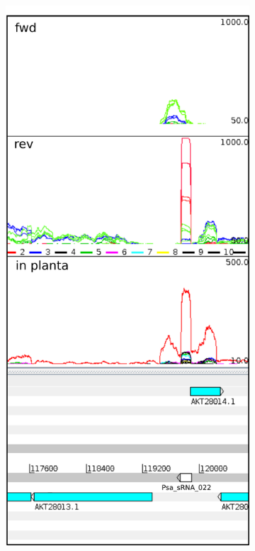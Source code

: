 \begin{figure}[H]
\begin{subfigure}{0.49\textwidth}
\includegraphics[scale=0.7]{psa/psa_ncRNA/psa_srna_022_exp.png} 
\end{subfigure}

\end{figure}
